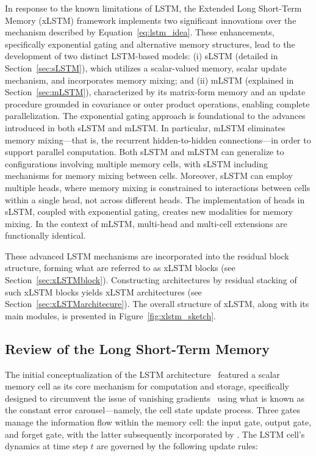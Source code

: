 In response to the known limitations of LSTM, the Extended Long Short-Term Memory (xLSTM) framework implements two significant innovations over the mechanism described by Equation~\eqref{eq:lstm_idea}. These enhancements, specifically exponential gating and alternative memory structures, lead to the development of two distinct LSTM-based models: (i) sLSTM (detailed in Section~\ref{sec:sLSTM}), which utilizes a scalar-valued memory, scalar update mechanism, and incorporates memory mixing; and (ii) mLSTM (explained in Section~\ref{sec:mLSTM}), characterized by its matrix-form memory and an update procedure grounded in covariance or outer product operations, enabling complete parallelization. The exponential gating approach is foundational to the advances introduced in both sLSTM and mLSTM. In particular, mLSTM eliminates memory mixing---that is, the recurrent hidden-to-hidden connections---in order to support parallel computation. Both sLSTM and mLSTM can generalize to configurations involving multiple memory cells, with sLSTM including mechanisms for memory mixing between cells. Moreover, sLSTM can employ multiple heads, where memory mixing is constrained to interactions between cells within a single head, not across different heads. The implementation of heads in sLSTM, coupled with exponential gating, creates new modalities for memory mixing. In the context of mLSTM, multi-head and multi-cell extensions are functionally identical.

These advanced LSTM mechanisms are incorporated into the residual block structure, forming what are referred to as xLSTM blocks (see Section~\ref{sec:xLSTMblock}). Constructing architectures by residual stacking of such xLSTM blocks yields xLSTM architectures (see Section~\ref{sec:xLSTMarchitecure}). The overall structure of xLSTM, along with its main modules, is presented in Figure~\ref{fig:xlstm_sketch}.

\subsection{Review of the Long Short-Term Memory}
\label{sec:orgLSTM}

The initial conceptualization of the LSTM architecture~\citep{Hochreiter:91,Hochreiter:97nips,Hochreiter:97} featured a scalar memory cell as its core mechanism for computation and storage, specifically designed to circumvent the issue of vanishing gradients~\citep{Hochreiter:91,Hochreiter:00book} using what is known as the constant error carousel—namely, the cell state update process. Three gates manage the information flow within the memory cell: the input gate, output gate, and forget gate, with the latter subsequently incorporated by \citet{Gers:00}.  
The LSTM cell’s dynamics at time step $t$ are governed by the following update rules:

